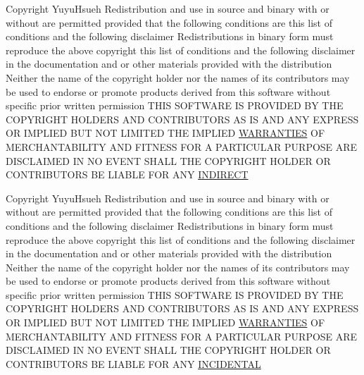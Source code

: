 \begin{DoxyCompactItemize}
Copyright Yuyu\+Hsueh Redistribution and use in source and binary with or without are permitted provided that the following conditions are this list of conditions and the following disclaimer Redistributions in binary form must reproduce the above copyright this list of conditions and the following disclaimer in the documentation and or other materials provided with the distribution Neither the name of the copyright holder nor the names of its contributors may be used to endorse or promote products derived from this software without specific prior written permission T\+H\+IS S\+O\+F\+T\+W\+A\+RE IS P\+R\+O\+V\+I\+D\+ED BY T\+HE C\+O\+P\+Y\+R\+I\+G\+HT H\+O\+L\+D\+E\+RS A\+ND C\+O\+N\+T\+R\+I\+B\+U\+T\+O\+RS AS IS A\+ND A\+NY E\+X\+P\+R\+E\+SS OR I\+M\+P\+L\+I\+ED B\+UT N\+OT L\+I\+M\+I\+T\+ED T\+HE I\+M\+P\+L\+I\+ED \hyperlink{license_8txt_a042eb66328050ad88743187ae8e43b95}{W\+A\+R\+R\+A\+N\+T\+I\+ES} OF M\+E\+R\+C\+H\+A\+N\+T\+A\+B\+I\+L\+I\+TY A\+ND F\+I\+T\+N\+E\+SS F\+OR A P\+A\+R\+T\+I\+C\+U\+L\+AR P\+U\+R\+P\+O\+SE A\+RE D\+I\+S\+C\+L\+A\+I\+M\+ED IN NO E\+V\+E\+NT S\+H\+A\+LL T\+HE C\+O\+P\+Y\+R\+I\+G\+HT H\+O\+L\+D\+ER OR C\+O\+N\+T\+R\+I\+B\+U\+T\+O\+RS BE L\+I\+A\+B\+LE F\+OR A\+NY \hyperlink{license_8txt_a8c44c311e30c2c13cd7035f237993b51}{I\+N\+D\+I\+R\+E\+CT}
\item 
Copyright Yuyu\+Hsueh Redistribution and use in source and binary with or without are permitted provided that the following conditions are this list of conditions and the following disclaimer Redistributions in binary form must reproduce the above copyright this list of conditions and the following disclaimer in the documentation and or other materials provided with the distribution Neither the name of the copyright holder nor the names of its contributors may be used to endorse or promote products derived from this software without specific prior written permission T\+H\+IS S\+O\+F\+T\+W\+A\+RE IS P\+R\+O\+V\+I\+D\+ED BY T\+HE C\+O\+P\+Y\+R\+I\+G\+HT H\+O\+L\+D\+E\+RS A\+ND C\+O\+N\+T\+R\+I\+B\+U\+T\+O\+RS AS IS A\+ND A\+NY E\+X\+P\+R\+E\+SS OR I\+M\+P\+L\+I\+ED B\+UT N\+OT L\+I\+M\+I\+T\+ED T\+HE I\+M\+P\+L\+I\+ED \hyperlink{license_8txt_a042eb66328050ad88743187ae8e43b95}{W\+A\+R\+R\+A\+N\+T\+I\+ES} OF M\+E\+R\+C\+H\+A\+N\+T\+A\+B\+I\+L\+I\+TY A\+ND F\+I\+T\+N\+E\+SS F\+OR A P\+A\+R\+T\+I\+C\+U\+L\+AR P\+U\+R\+P\+O\+SE A\+RE D\+I\+S\+C\+L\+A\+I\+M\+ED IN NO E\+V\+E\+NT S\+H\+A\+LL T\+HE C\+O\+P\+Y\+R\+I\+G\+HT H\+O\+L\+D\+ER OR C\+O\+N\+T\+R\+I\+B\+U\+T\+O\+RS BE L\+I\+A\+B\+LE F\+OR A\+NY \hyperlink{license_8txt_a6fe13299500a9a6c4af4434723e6afae}{I\+N\+C\+I\+D\+E\+N\+T\+AL}

\end{DoxyCompactItemize}
